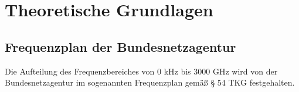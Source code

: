 
\chapter{Theoretische Grundlagen}
\section{Frequenzplan der Bundesnetzagentur}
Die Aufteilung des Frequenzbereiches von 0 kHz bis 3000 GHz wird von der Bundesnetzagentur im sogenannten Frequenzplan \cite[Bundesnetzagentur, 2016]{bundesnetzagentur-frequenzplan:2016} gemäß § 54 TKG festgehalten.
